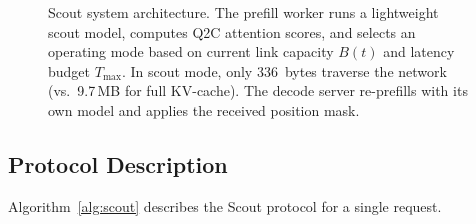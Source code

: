\documentclass{article}
\begin{document}
\begin{figure}[t]
\caption{Scout system architecture. The prefill worker runs a lightweight scout model, computes Q2C attention scores, and selects an operating mode based on current link capacity $B(t)$ and latency budget $T_{\max}$. In scout mode, only 336~bytes traverse the network (vs.\ 9.7\,MB for full KV-cache). The decode server re-prefills with its own model and applies the received position mask.}
\label{fig:system}
\end{figure}

\subsection{Protocol Description}

Algorithm~\ref{alg:scout} describes the Scout protocol for a single request.
\end{document}

